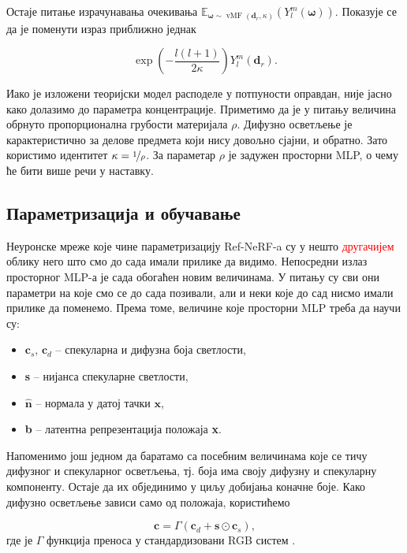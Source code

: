 \documentclass[12pt, a4paper, twoside]{book}
\numberwithin{equation}{chapter}
\numberwithin{theorem}{section}
\numberwithin{definition}{section}
\numberwithin{definitionChapter}{chapter}
\begin{document}
Остаје питање израчунавања очекивања
$\mathbb{E}_{\boldsymbol{\omega} \sim \operatorname{vMF}(\textbf{d}_r, \kappa)}(Y_{l}^{m}(\boldsymbol{\omega}))$.
Показује се \cite{ref-nerf} да је поменути израз приближно једнак

	\begin{equation}
		\exp\left(-\frac{l(l+1)}{2\kappa}\right)Y_{l}^{m}(\textbf{d}_r).
	\end{equation}

Иако је изложени теоријски модел расподеле у потпуности оправдан, није јасно како долазимо до параметра концентрације.
Приметимо да је у питању величина обрнуто пропорционална грубости материјала $\rho$. Дифузно осветљење је карактеристично
за делове предмета који нису довољно сјајни, и обратно. Зато користимо идентитет $\kappa = \nicefrac{1}{\rho}$.
За параметар $\rho$ је задужен просторни MLP, о чему ће бити више речи у наставку.

\subsection{Параметризација и обучавање}
Неуронске мреже које чине параметризацију Ref-NeRF-a су у нешто \textcolor{red}{другачијем} облику него што смо до сада имали прилике
да видимо. Непосредни излаз просторног MLP-а је сада обогаћен новим величинама. У питању су сви они параметри
на које смо се до сада позивали, али и неки које до сад нисмо имали прилике да поменемо. Према томе,
величине које просторни MLP треба да научи су:

	\begin{itemize}
		\item $\textbf{c}_s$, $\textbf{c}_d$ -- спекуларна и дифузна боја светлости,
		\item \textbf{s} -- нијанса спекуларне светлости,
		\item $\hat{\textbf{n}}$ -- нормала у датој тачки $\textbf{x}$,
		\item \textbf{b} -- латентна репрезентација положаја \textbf{x}. 
	\end{itemize}

Напоменимо још једном да баратамо са посебним величинама које се тичу дифузног и спекуларног осветљења, тј. боја има
своју дифузну и спекуларну компоненту. Остаје да их објединимо у циљу добијања коначне боје. Како дифузно
осветљење зависи само од положаја, користићемо

\begin{equation}
	\textbf{c} = \Gamma(\textbf{c}_d + \textbf{s} \odot \textbf{c}_s),
	\label{eqn-tone}
\end{equation}
где је $\Gamma$ функција преноса у стандардизовани RGB систем \cite{sgrb}.
\end{document}
